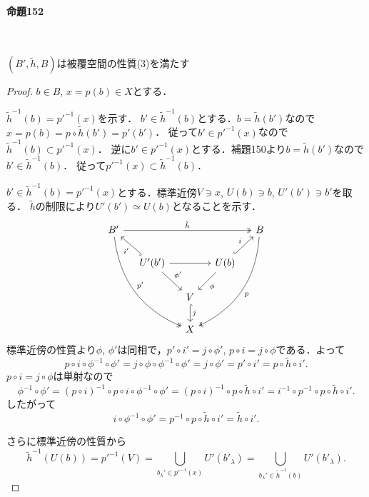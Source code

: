 \documentclass[a4paper, leqno]{ltjsreport}
\begin{document}
\paragraph{命題152}~
\begin{screen}
  \((B', \tilde{h}, B)\)は被覆空間の性質(3)を満たす
\end{screen}
\begin{proof}
  \(b \in B\), \(x = p(b) \in X\)とする．

  \(\tilde{h}^{-1}(b) = p'^{-1}(x)\)を示す．
  \(b' \in \tilde{h}^{-1}(b)\)とする．\(b = \tilde{h}(b')\)なので\(x = p(b) = p\circ\tilde{h}(b') = p'(b')\)．
  従って\(b' \in p'^{-1}(x)\)なので\(\tilde{h}^{-1}(b) \subset p'^{-1}(x)\)．
  逆に\(b' \in p'^{-1}(x)\)とする．補題150より\(b = \tilde{h}(b')\)なので\(b' \in\tilde{h}^{-1}(b)\)．
  従って\(p'^{-1}(x) \subset\tilde{h}^{-1}(b)\)．

  \(b' \in \tilde{h}^{-1}(b) = p'^{-1}(x)\)とする．標準近傍\(V \ni x\), \(U(b)\ni b\), \(U'(b')\ni b'\)を取る．
  \(\tilde{h}\)の制限により\(U'(b') \simeq U(b)\)となることを示す．
  \[
  \begin{tikzcd}[column sep=small]
    B' \arrow[rrrr, "\tilde{h}", twoheadrightarrow]\arrow[rrddd, "p'", twoheadrightarrow, bend right] &&&& B \arrow[llddd, "p", twoheadrightarrow, bend left] \\
    & U'(b') \arrow[lu, "i'", hookrightarrow] \arrow[rr] \arrow[rd, "\phi'"] && U(b) \arrow[ru, "i", hookrightarrow] \arrow[ld, "\phi"]& \\
    && V \arrow[d, "j", hookrightarrow] && \\
    && X &&
  \end{tikzcd}
  \]
  標準近傍の性質より\(\phi\), \(\phi'\)は同相で，\(p'\circ i' = j\circ\phi'\), \(p\circ i = j\circ\phi\)である．よって
  \[
    p\circ i\circ\phi^{-1}\circ\phi' = j\circ\phi\circ\phi^{-1}\circ\phi' = j\circ\phi' = p'\circ i' = p\circ\tilde{h}\circ i' .
  \]
  \(p\circ i = j\circ\phi\)は単射なので
  \[
    \phi^{-1}\circ\phi' = (p\circ i)^{-1}\circ p\circ i\circ\phi^{-1}\circ\phi' = (p\circ i)^{-1}\circ p\circ\tilde{h}\circ i'
    = i^{-1}\circ p^{-1} \circ p \circ\tilde{h}\circ i' .
  \]
  したがって
  \[ i\circ\phi^{-1}\circ\phi' = p^{-1} \circ p \circ\tilde{h}\circ i' = \tilde{h}\circ i' . \]

  さらに標準近傍の性質から
  \[
    \tilde{h}^{-1}(U(b)) = p'^{-1}(V) = \bigcup_{b_\lambda' \in p'^{-1}(x)} U'(b'_\lambda) = \bigcup_{b_\lambda' \in \tilde{h}^{-1}(b)} U'(b'_\lambda) .
  \]
\end{proof}
\end{document}
